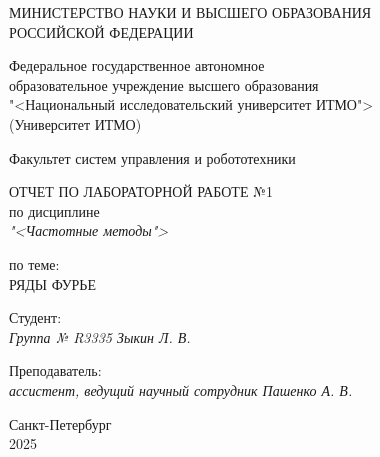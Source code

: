 \thispagestyle{empty}

\begin{center}
    МИНИСТЕРСТВО НАУКИ И ВЫСШЕГО ОБРАЗОВАНИЯ \\ РОССИЙСКОЙ ФЕДЕРАЦИИ

    \vspace{20pt}

    Федеральное государственное автономное \\ образовательное учреждение высшего образования \\
    "<Национальный исследовательский университет ИТМО"> \\
    (Университет ИТМО)

    \vspace{20pt}

    Факультет систем управления и робототехники
\end{center}

\vfill

\begin{center}
    ОТЧЕТ ПО ЛАБОРАТОРНОЙ РАБОТЕ №1\\  
    по дисциплине \\
    \textit{"<Частотные методы">}

    \vspace{20pt}

    по теме: \\
    \uppercase{Ряды Фурье}
\end{center}

\vfill

    \noindent Студент: \\
    \textit{Группа № R3335 \hfill Зыкин Л. В.}

    \vspace{20pt}

    \noindent Преподаватель: \\
    \textit{ассистент, ведущий научный сотрудник \hfill Пашенко А. В.}

\vfill

\begin{center}
    Санкт-Петербург \\ 2025
\end{center}